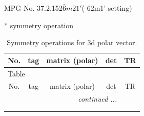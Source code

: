 \documentclass[fleqn,8pt]{jsarticle}
\begin{document}
\setcounter{MaxMatrixCols}{32}

\renewcommand{\tablename}{Table~}
\renewcommand{\figurename}{Figure~}
\begin{center}
\LARGE
MPG No. 37.2.152\quad$\bar{6}m21'$\quad(-62m1' setting)
\end{center}
* symmetry operation
\renewcommand{\arraystretch}{1.3}
\begin{longtable}{ccccc}
\caption{Symmetry operations for 3d polar vector.}
 \\
 \hline \hline
No. & tag & matrix (polar) & det & TR \\ \hline \endfirsthead

\multicolumn{4}{l}{\tablename\ \thetable{}} \\
 \hline \hline
No. & tag & matrix (polar) & det & TR \\ \hline \endhead

 \hline \hline
\multicolumn{4}{r}{\footnotesize\it continued ...} \\ \endfoot

 \hline \hline
\multicolumn{4}{r}{} \\ \endlastfoot


\end{longtable}
\end{document}
